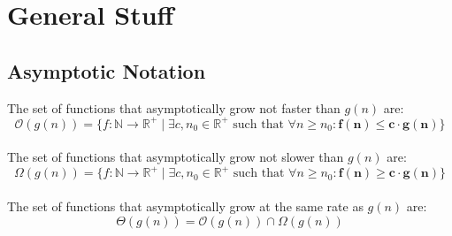 
\section{General Stuff}

\subsection{Asymptotic Notation}

The set of functions that asymptotically grow not faster than \( g \left( n \right) \) are:
\begin{equation*}
    \mathcal{O} \left( g \left( n \right) \right) = \{ 
    f: \mathbb{N} \rightarrow \mathbb{R}^+ \mid \exists c, n_0 \in \mathbb{R}^+ \text{ such that } \forall n \geq n_0: \bm{f(n) \leq c \cdot g(n)  }
    \} 
\end{equation*}
\\
The set of functions that asymptotically grow not slower than \( g \left( n \right) \) are:
\begin{equation*}
    \Omega \left( g \left( n \right) \right) = \{
    f: \mathbb{N} \rightarrow \mathbb{R}^+ \mid \exists c, n_0 \in \mathbb{R}^+ \text{ such that } \forall n \geq n_0: \bm{f(n) \geq c \cdot g(n)}
    \}
\end{equation*}
\\
The set of functions that asymptotically grow at the same rate as \( g \left( n \right) \) are:
\begin{equation*}
    \Theta \left( g \left( n \right) \right) =  \mathcal{O} \left( g \left( n \right) \right) \cap  \Omega \left( g \left( n \right) \right) 
\end{equation*}